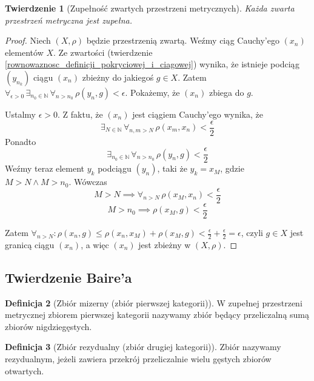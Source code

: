 \documentclass[licencjacka]{pwr_wmat_praca_dyplomowa}
\theoremstyle{plain}
\newtheorem{theorem}{Twierdzenie}
\numberwithin{theorem}{chapter}
\theoremstyle{definition}
\numberwithin{theorem}{chapter}
\newtheorem{definition}[theorem]{Definicja}
\begin{document}
\begin{theorem}[Zupełność zwartych przestrzeni metrycznych] \label{zwarta_jest_zupelna}
Każda zwarta przestrzeń metryczna jest zupełna.
\end{theorem}

\begin{proof}
Niech $(X, \rho)$  będzie przestrzenią zwartą.
Weźmy ciąg Cauchy'ego $(x_n)$ elementów $X$. Ze zwartości (twierdzenie \ref{rownowaznosc_definicji_pokryciowej_i_ciagowej}) wynika, że istnieje podciąg $(y_{n_k})$ ciągu $(x_n)$ zbieżny do jakiegoś $g \in X$. Zatem $\forall_{\epsilon > 0} \, \exists_{n_0 \in \mathbb{N}} \, \forall_{n > n_0} \, \rho(y_n, g) < \epsilon$.
Pokażemy, że $(x_n)$ zbiega do $g$.

Ustalmy $\epsilon > 0$. Z faktu, że $(x_n)$ jest ciągiem Cauchy'ego wynika, że $$\exists_{N \in \mathbb{N}} \, \forall_{n, m > N} \, \rho(x_m, x_n) < \frac{\epsilon}{2}$$ Ponadto $$\exists_{n_0 \in \mathbb{N}} \, \forall_{n > n_0} \, \rho(y_n, g) < \frac{\epsilon}{2}$$ Weźmy teraz element $y_{k}$ podciągu $(y_n)$, taki że $y_{k} = x_M$, gdzie $M > N \land M > n_0$. Wówczas 
$$M > N \implies \forall_{n > N} \, \rho(x_M, x_n) < \frac{\epsilon}{2}$$
$$M > n_0 \implies \rho(x_M, g) < \frac{\epsilon}{2}$$

Zatem $\forall_{n > N}: \rho(x_n, g) \leq \rho(x_n, x_M) + \rho(x_M, g) < \frac{\epsilon}{2} + \frac{\epsilon}{2} = \epsilon$, czyli $g \in X$ jest granicą ciągu $(x_n)$, a więc $(x_n)$ jest zbieżny w $(X, \rho)$.
\end{proof}



\subsection{Twierdzenie Baire'a}

\begin{definition}[Zbiór mizerny (zbiór pierwszej kategorii)]
W zupełnej przestrzeni metrycznej zbiorem pierwszej kategorii nazywamy zbiór będący przeliczalną sumą zbiorów nigdziegęstych.
\end{definition}

\begin{definition}[Zbiór rezydualny (zbiór drugiej kategorii)]
\label{definicja_zbioru_rezydualnego}
Zbiór nazywamy rezydualnym, jeżeli zawiera przekrój przeliczalnie wielu gęstych zbiorów otwartych.
\end{definition}
\end{document}

